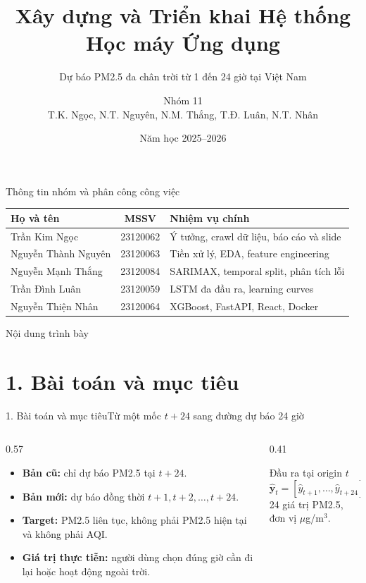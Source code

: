\documentclass[aspectratio=169]{beamer}
\title[Dự báo PM2.5 đa chân trời]{\textbf{Xây dựng và Triển khai Hệ thống Học máy Ứng dụng}}
\subtitle{Dự báo PM2.5 đa chân trời từ 1 đến 24 giờ tại Việt Nam}
\author[Nhóm 11]{Nhóm 11\\\small T.K. Ngọc, N.T. Nguyên, N.M. Thắng, T.Đ. Luân, N.T. Nhân}
\institute[KHTN TP.HCM]{Nhập môn Học máy - Đại học Khoa học Tự nhiên TP.HCM}
\date{Năm học 2025--2026}
\begin{document}
\begin{frame}\titlepage\end{frame}

\begin{frame}{Thông tin nhóm và phân công công việc}
\small
\begin{table}
\begin{tabular}{lcl}
\toprule
Họ và tên & MSSV & Nhiệm vụ chính\\
\midrule
Trần Kim Ngọc & 23120062 & Ý tưởng, crawl dữ liệu, báo cáo và slide\\
Nguyễn Thành Nguyên & 23120063 & Tiền xử lý, EDA, feature engineering\\
Nguyễn Mạnh Thắng & 23120084 & SARIMAX, temporal split, phân tích lỗi\\
Trần Đình Luân & 23120059 & LSTM đa đầu ra, learning curves\\
Nguyễn Thiện Nhân & 23120064 & XGBoost, FastAPI, React, Docker\\
\bottomrule
\end{tabular}
\end{table}
\end{frame}

\begin{frame}{Nội dung trình bày}\tableofcontents\end{frame}

\section{1. Bài toán và mục tiêu}
\begin{frame}{1. Bài toán và mục tiêu}{Từ một mốc $t+24$ sang đường dự báo 24 giờ}
\begin{columns}[T]
\begin{column}{0.57\textwidth}
\begin{itemize}
\item \textbf{Bản cũ:} chỉ dự báo PM2.5 tại $t+24$.
\item \textbf{Bản mới:} dự báo đồng thời $t+1,t+2,\ldots,t+24$.
\item \textbf{Target:} PM2.5 liên tục, không phải PM2.5 hiện tại và không phải AQI.
\item \textbf{Giá trị thực tiễn:} người dùng chọn đúng giờ cần đi lại hoặc hoạt động ngoài trời.
\end{itemize}
\end{column}
\begin{column}{0.41\textwidth}
\begin{alertblock}{Đầu ra tại origin $t$}
\[
\hat{\mathbf y}_t=[\hat y_{t+1},\ldots,\hat y_{t+24}]
\]
24 giá trị PM2.5, đơn vị $\mu$g/m$^3$.
\end{alertblock}
\end{column}
\end{columns}
\end{frame}
\end{document}
